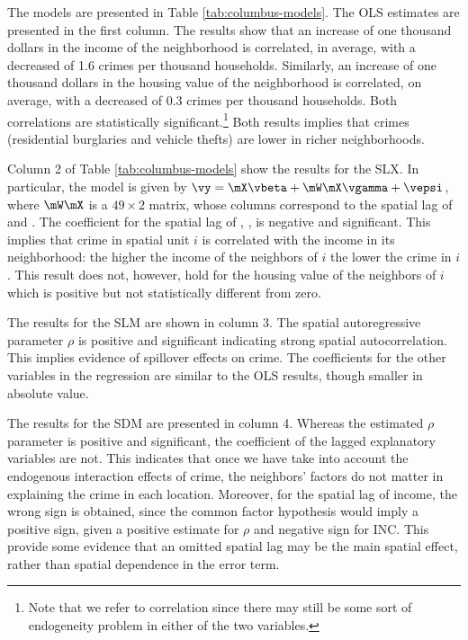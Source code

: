 The models are presented in Table \ref{tab:columbus-models}. The OLS estimates are presented in the first column. The results show that an increase of one  thousand dollars in the income of the neighborhood is correlated, in average, with a decreased of 1.6 crimes per thousand households. Similarly, an increase of one thousand dollars in the housing value of the neighborhood is correlated, on average, with a decreased of 0.3 crimes per thousand households. Both correlations are statistically significant.\footnote{Note that we refer to correlation since there may still be some sort of endogeneity problem in either of the two variables.} Both results implies that crimes (residential burglaries and vehicle thefts) are lower in richer neighborhoods. 

Column 2 of Table \ref{tab:columbus-models} show the results for the SLX. In particular, the model is given by $\vy = \mX\vbeta + \mW\mX\vgamma + \vepsi$, where $\mW\mX$ is a $49\times 2$ matrix, whose columns correspond to the spatial lag of  and . The coefficient for the spatial lag of , , is negative and significant. This implies that crime in spatial unit $i$ is correlated with the income in its neighborhood: the higher the income of the neighbors of $i$ the lower the crime in $i$. This result does not, however, hold for the housing value of the neighbors of $i$ which is positive but not statistically different from zero. 

The results for the SLM are shown in column 3. The spatial autoregressive parameter $\rho$ is positive and significant indicating strong spatial autocorrelation. This implies evidence of spillover effects on crime. The coefficients for the other variables in the regression are similar to the OLS results, though smaller in absolute value.

The results for the SDM are presented in column 4. Whereas the estimated $\rho$ parameter is positive and significant, the coefficient of the lagged explanatory variables are not. This indicates that once we have take into account the endogenous interaction effects of crime, the neighbors' factors do not matter in explaining the crime in each location. Moreover, for the spatial lag of income, the wrong sign is obtained, since the common factor hypothesis would imply a positive sign, given a positive estimate for $\rho$ and negative sign for INC. This provide some evidence that an omitted spatial lag may be the main spatial effect, rather than spatial dependence in the error term. 

